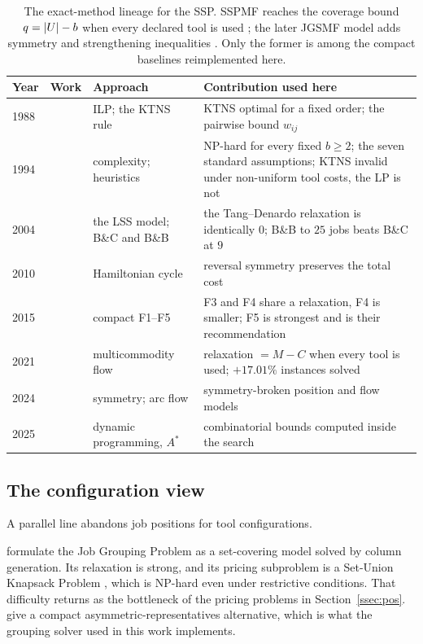 \begin{table}[t]\centering
\scriptsize
\setlength{\tabcolsep}{4pt}
\begin{tabular}{@{}lll p{5.9cm}@{}}
\toprule
Year & Work & Approach & Contribution used here \\
\midrule
1988 & \citet{Tang1988}      & ILP; the KTNS rule           & KTNS optimal for a fixed order; the pairwise bound $w_{ij}$ \\
1994 & \citet{Crama1994}     & complexity; heuristics       & NP-hard for every fixed $b\ge2$; the seven standard assumptions; KTNS invalid under non-uniform tool costs, the LP is not \\
2004 & \citet{Laporte2004}   & the LSS model; B\&C and B\&B & the Tang--Denardo relaxation is identically $0$; B\&B to $25$ jobs beats B\&C at $9$ \\
2010 & \citet{Ghiani2010}    & Hamiltonian cycle            & reversal symmetry preserves the total cost \\
2015 & \citet{Catanzaro2015} & compact F1--F5               & F3 and F4 share a relaxation, F4 is smaller; F5 is strongest and is their recommendation \\
2021 & \citet{daSilva2024}   & multicommodity flow          & relaxation $=M-C$ when every tool is used; $+17.01\%$ instances solved \\
2024 & \citet{Akhundov2024}  & symmetry; arc flow           & symmetry-broken position and flow models \\
2025 & \citet{Legrand2025}   & dynamic programming, $A^{*}$ & combinatorial bounds computed inside the search \\
\bottomrule
\end{tabular}
\caption{The exact-method lineage for the SSP. SSPMF reaches the coverage bound
$q=\lvert U\rvert-b$ when every declared tool is used \citep{daSilva2024}; the later
JGSMF model adds symmetry and strengthening inequalities \citep{Akhundov2024}.
Only the former is among the compact baselines reimplemented here.}
\label{tab:lineage}
\end{table}

\subsection{The configuration view}\label{ssec:sota-config}

A parallel line abandons job positions for tool configurations.

\citet{Crama1994Column} formulate the Job Grouping Problem as a set-covering model
solved by column generation. Its relaxation is strong, and its pricing subproblem is
a Set-Union Knapsack Problem \citep{Goldschmidt1994}, which is NP-hard even under
restrictive conditions. That difficulty returns as the bottleneck of the pricing
problems in Section~\ref{ssec:pos}. \citet{Jans2013} give a compact
asymmetric-representatives alternative, which is what the grouping solver used in
this work implements.

